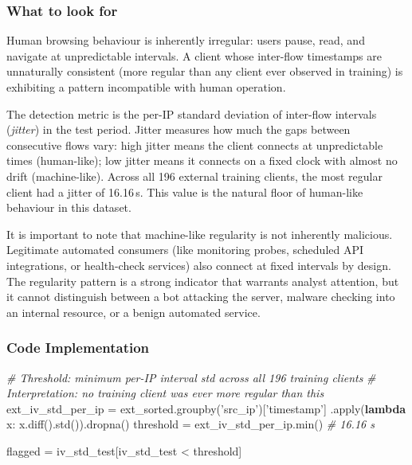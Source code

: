 \documentclass[
  11pt,
]{article}
\newenvironment{Shaded}{\vspace{4pt}}{\vspace{4pt}}
\newcommand{\BuiltInTok}[1]{\textcolor[rgb]{0.00,0.50,0.00}{#1}}
\newcommand{\CommentTok}[1]{\textcolor[rgb]{0.38,0.63,0.69}{\textit{#1}}}
\newcommand{\KeywordTok}[1]{\textcolor[rgb]{0.00,0.44,0.13}{\textbf{#1}}}
\newcommand{\NormalTok}[1]{#1}
\newcommand{\OperatorTok}[1]{\textcolor[rgb]{0.40,0.40,0.40}{#1}}
\newcommand{\StringTok}[1]{\textcolor[rgb]{0.25,0.44,0.63}{#1}}
\begin{document}
\subsubsection{What to look for}

Human browsing behaviour is inherently irregular: users pause, read,
and navigate at unpredictable intervals. A client whose inter-flow
timestamps are unnaturally consistent (more regular than any client
ever observed in training) is exhibiting a pattern incompatible with
human operation.

The detection metric is the per-IP standard deviation of inter-flow
intervals (\emph{jitter}) in the test period. Jitter
measures how much the gaps between consecutive flows vary: high jitter
means the client connects at unpredictable times (human-like); low
jitter means it connects on a fixed clock with almost no drift
(machine-like). Across all 196 external training clients, the most
regular client had a jitter of 16.16\,s. This value is the natural
floor of human-like behaviour in this dataset.

It is important to note that machine-like regularity is not inherently
malicious. Legitimate automated consumers (like monitoring probes, scheduled
API integrations, or health-check services) also connect at fixed
intervals by design. The regularity pattern is a
strong indicator that warrants analyst attention, but it cannot
distinguish between a bot attacking the server, malware checking into
an internal resource, or a benign automated service.

\subsubsection{Code Implementation}

\begin{Shaded}
\begin{Highlighting}[]
\CommentTok{\# Threshold: minimum per-IP interval std across all 196 training clients}
\CommentTok{\# Interpretation: no training client was ever more regular than this}
\NormalTok{ext\_iv\_std\_per\_ip }\OperatorTok{=}\NormalTok{ ext\_sorted.groupby(}\StringTok{'src\_ip'}\NormalTok{)[}\StringTok{'timestamp'}\NormalTok{]}
\NormalTok{                  .apply(}\KeywordTok{lambda}\NormalTok{ x: x.diff().std()).dropna()}
\NormalTok{threshold }\OperatorTok{=}\NormalTok{ ext\_iv\_std\_per\_ip.}\BuiltInTok{min}\NormalTok{()  }\CommentTok{\# 16.16 s}

\NormalTok{flagged }\OperatorTok{=}\NormalTok{ iv\_std\_test[iv\_std\_test }\OperatorTok{<}\NormalTok{ threshold]}
\end{Highlighting}
\end{Shaded}
\end{document}
